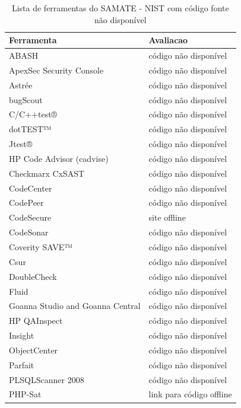 \documentclass[qual, classic, a4paper]{ufbathesis}
\begin{document}

\begin{table}
\caption{Lista de ferramentas do SAMATE - NIST com código fonte não disponível}
\centering
\begin{tabular}{| l | l |}
\hline
Ferramenta & Avaliacao  \\
\hline
ABASH                     & código não disponível \\
ApexSec Security Console  & código não disponível \\
Astrée                    & código não disponível \\
bugScout                  & código não disponível \\
C/C++test®                & código não disponível \\
dotTEST™                  & código não disponível \\
Jtest®                    & código não disponível \\
HP Code Advisor (cadvise) & código não disponível \\
Checkmarx CxSAST          & código não disponível \\
CodeCenter                & código não disponível \\
CodePeer                  & código não disponível \\
CodeSecure                & site offline \\
CodeSonar                 & código não disponível \\
Coverity SAVE™            & código não disponível \\
Csur                      & código não disponível \\
DoubleCheck               & código não disponível \\
Fluid                     & código não disponível \\
Goanna Studio and Goanna Central & código não disponível \\
HP QAInspect              & código não disponível \\
Insight                   & código não disponível \\
ObjectCenter              & código não disponível \\
Parfait                   & código não disponível \\
PLSQLScanner 2008         & código não disponível \\
PHP-Sat                   & link para código offline \\

\end{tabular}
\end{table}
\end{document}
